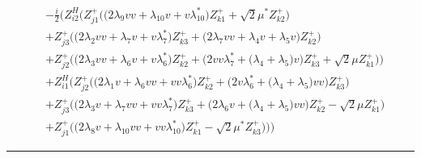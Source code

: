 \begin{align} 
 &-\frac{i}{2} \Big(Z_{{i 2}}^{H} \Big(Z_{{j 1}}^{+} \Big(\Big(2 \lambda_9 vv  + \lambda_10 v  + v \lambda_10^* \Big)Z_{{k 1}}^{+}  + \sqrt{2} \mu^* Z_{{k 2}}^{+} \Big)\nonumber \\ 
 &+Z_{{j 3}}^{+} \Big(\Big(2 \lambda_2 vv  + \lambda_7 v  + v \lambda_7^* \Big)Z_{{k 3}}^{+}  + \Big(2 \lambda_7 vv  + \lambda_4 v  + \lambda_5 v \Big)Z_{{k 2}}^{+} \Big)\nonumber \\ 
 &+Z_{{j 2}}^{+} \Big(\Big(2 \lambda_3 vv  + \lambda_6 v  + v \lambda_6^* \Big)Z_{{k 2}}^{+}  + \Big(2 vv \lambda_7^*  + \Big(\lambda_4 + \lambda_5\Big)v \Big)Z_{{k 3}}^{+}  + \sqrt{2} \mu Z_{{k 1}}^{+} \Big)\Big)\nonumber \\ 
 &+Z_{{i 1}}^{H} \Big(Z_{{j 2}}^{+} \Big(\Big(2 \lambda_1 v  + \lambda_6 vv  + vv \lambda_6^* \Big)Z_{{k 2}}^{+}  + \Big(2 v \lambda_6^*  + \Big(\lambda_4 + \lambda_5\Big)vv \Big)Z_{{k 3}}^{+} \Big)\nonumber \\ 
 &+Z_{{j 3}}^{+} \Big(\Big(2 \lambda_3 v  + \lambda_7 vv  + vv \lambda_7^* \Big)Z_{{k 3}}^{+}  + \Big(2 \lambda_6 v  + \Big(\lambda_4 + \lambda_5\Big)vv \Big)Z_{{k 2}}^{+}  - \sqrt{2} \mu Z_{{k 1}}^{+} \Big)\nonumber \\ 
 &+Z_{{j 1}}^{+} \Big(\Big(2 \lambda_8 v  + \lambda_10 vv  + vv \lambda_10^* \Big)Z_{{k 1}}^{+}  - \sqrt{2} \mu^* Z_{{k 3}}^{+} \Big)\Big)\Big)\end{align} 
\hrule 
